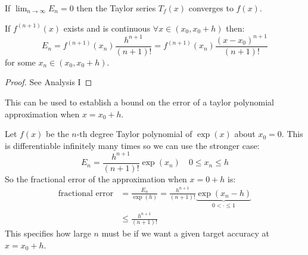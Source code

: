 \documentclass[../main.tex]{subfiles}
\begin{document}
If $\lim_{n \to \infty} E_n = 0$ then the Taylor series $T_f(x)$ converges to $f(x)$.

\begin{theorem}
If $f^{(n+1)}(x)$ exists and is continuous $\forall x \in (x_0, x_0 + h)$ then:
\[
  E_n = f^{(n+1)}(x_n) \frac{h^{n+1}}{(n+1)!} = f^{(n + 1)}(x_n)\frac{(x - x_0)^{n + 1}}{(n + 1)!}
\]
for some $x_n \in (x_0, x_0 + h)$.
\end{theorem}
\begin{proof}
  See Analysis I
\end{proof}

This can be used to establish a bound on the error of a taylor polynomial approximation when $x = x_0 + h$.
\begin{example}
  Let $f(x)$ be the $n$-th degree Taylor polynomial of $\exp(x)$ about $x_0 = 0$.
  This is differentiable infinitely many times so we can use the stronger case:
  \[
    E_n = \frac{h^{n + 1}}{(n + 1)!}\exp(x_n)\quad 0 \leq x_n \leq h
  \]
  So the fractional error of the approximation when $x = 0 + h$ is:
  \begin{align*}
    \text{fractional error} &= \frac{E_n}{\exp(h)} = \frac{h^{n+1}}{(n+1)!}\underbrace{\exp(x_n - h)}_{0 < \cdot \leq 1} \\
                            &\leq \frac{h^{n + 1}}{(n + 1)!}
  \end{align*}
  This specifies how large $n$ must be if we want a given target accuracy at $x = x_0 + h$.
\end{example}
\end{document}
